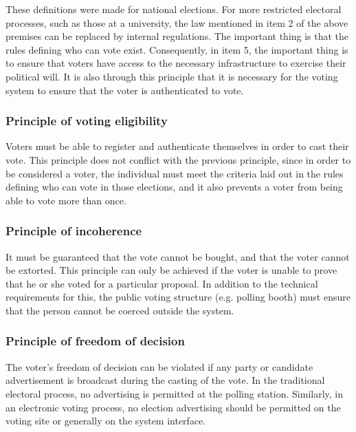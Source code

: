 \documentclass[english]{textolivre}
\begin{document}
These definitions were made for national elections. For more restricted electoral processes, such as those at a university, the law mentioned in item 2 of the above premises can be replaced by internal regulations. The important thing is that the rules defining who can vote exist. Consequently, in item 5, the important thing is to ensure that voters have access to the necessary infrastructure to exercise their political will. It is also through this principle that it is necessary for the voting system to ensure that the voter is authenticated to vote.

\subsubsection{Principle of voting eligibility}

Voters must be able to register and authenticate themselves in order to cast their vote. This principle does not conflict with the previous principle, since in order to be considered a voter, the individual must meet the criteria laid out in the rules defining who can vote in those elections, and it also prevents a voter from being able to vote more than once.

\subsubsection{Principle of incoherence \label{sec-principle-Incoherence}}

It must be guaranteed that the vote cannot be bought, and that the voter cannot be extorted. This principle can only be achieved if the voter is unable to prove that he or she voted for a particular proposal. In addition to the technical requirements for this, the public voting structure (e.g. polling booth) must ensure that the person cannot be coerced outside the system.

\subsubsection{Principle of freedom of decision \label{sec-principle-freedom}}

The voter's freedom of decision can be violated if any party or candidate advertisement is broadcast during the casting of the vote. In the traditional electoral process, no advertising is permitted at the polling station. Similarly, in an electronic voting process, no election advertising should be permitted on the voting site or generally on the system interface.
\end{document}
